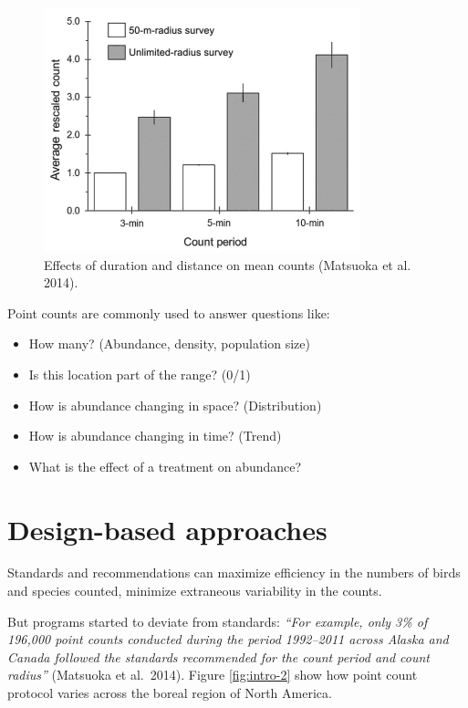 \documentclass[12pt,]{book}
\providecommand{\tightlist}{%
  \setlength{\itemsep}{0pt}\setlength{\parskip}{0pt}}
\begin{document}
\begin{figure}
\includegraphics[width=0.8\linewidth]{./images/matsuoka-2014-fig-2} \caption{Effects of duration and distance on mean counts (Matsuoka et al. 2014).}\label{fig:intro-1}
\end{figure}

Point counts are commonly used to answer questions like:

\begin{itemize}
\tightlist
\item
  How many? (Abundance, density, population size)
\item
  Is this location part of the range? (0/1)
\item
  How is abundance changing in space? (Distribution)
\item
  How is abundance changing in time? (Trend)
\item
  What is the effect of a treatment on abundance?
\end{itemize}

\hypertarget{design-based-approaches}{%
\section{Design-based approaches}\label{design-based-approaches}}

Standards and recommendations can
maximize efficiency in the numbers of birds and species counted,
minimize extraneous variability in the counts.

But programs started to deviate from standards:
\emph{``For example, only 3\% of 196,000 point counts conducted during the period
1992--2011 across Alaska and Canada followed the standards recommended for the count period and count radius''} (Matsuoka et al.~2014).
Figure \ref{fig:intro-2} show how point count protocol varies
across the boreal region of North America.
\end{document}
